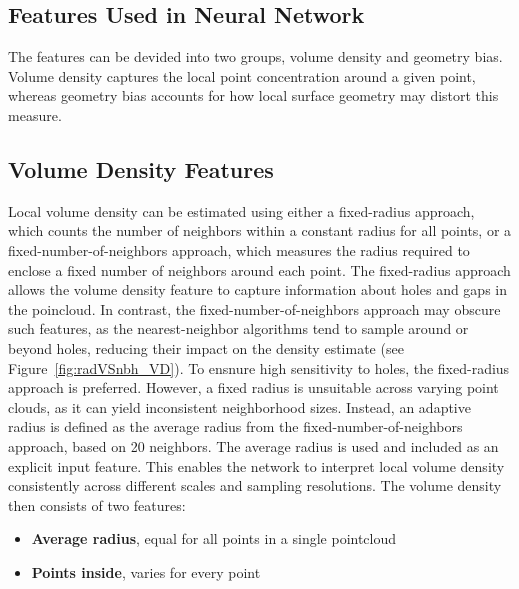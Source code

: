 \subsection{Features Used in Neural Network}
\label{sec:features}
The features can be devided into two groups, volume density and geometry bias. Volume density captures the local point concentration around a given point, whereas geometry bias accounts for how local surface geometry may distort this measure.

\subsection*{Volume Density Features}
Local volume density can be estimated using either a fixed-radius approach, which counts the number of neighbors within a constant radius for all points, or a fixed-number-of-neighbors approach, which measures the radius required to enclose a fixed number of neighbors around each point. The fixed-radius approach allows the volume density feature to capture information about holes and gaps in the poincloud. In contrast, the fixed-number-of-neighbors approach may obscure such features, as the nearest-neighbor algorithms tend to sample around or beyond holes, reducing their impact on the density estimate (see Figure~\ref{fig:radVSnbh_VD}). 
To ensnure high sensitivity to holes, the fixed-radius approach is preferred. However, a fixed radius is unsuitable across varying point clouds, as it can yield inconsistent neighborhood sizes. Instead, an adaptive radius is defined as the average radius from the fixed-number-of-neighbors approach, based on 20 neighbors. The average radius is used and included as an explicit input feature. This enables the network to interpret local volume density consistently across different scales and sampling resolutions.
The volume density then consists of two features:
\begin{itemize}
    \item \textbf{Average radius}, equal for all points in a single pointcloud 
    \item \textbf{Points inside}, varies for every point
\end{itemize}

